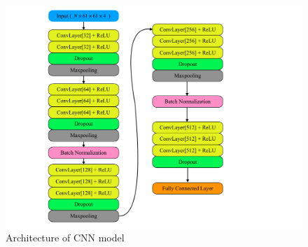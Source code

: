    \begin{figure}[!h]
        \centering
        \includegraphics[width=\textwidth]{Figures/cnn_arc.pdf}
        \caption{Architecture of CNN model}
        \label{fig:art}
    \end{figure}

